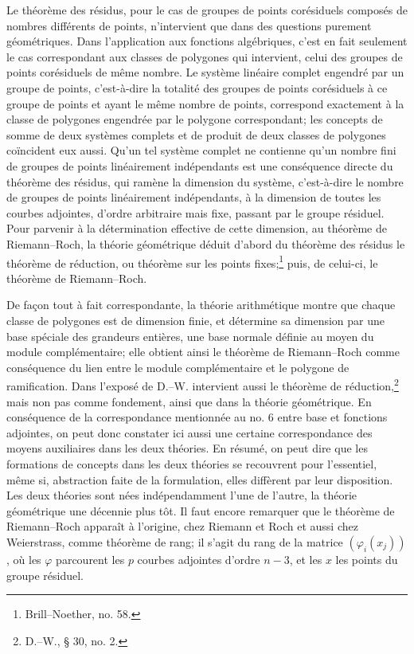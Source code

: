 Le théorème des résidus, pour le cas de groupes de points corésiduels composés de nombres différents de points, n'intervient que dans des questions purement géométriques. Dans l'application aux fonctions algébriques, c'est en fait seulement le cas correspondant aux classes de polygones qui intervient, celui des groupes de points corésiduels de même nombre. Le \og{}système linéaire complet\fg{} engendré par un groupe de points, c'est-à-dire la totalité des groupes de points corésiduels à ce groupe de points et ayant le même nombre de points, correspond exactement à la classe de polygones engendrée par le polygone correspondant; les concepts de \og{}somme de deux systèmes complets\fg{} et de \og{}produit de deux classes de polygones\fg{} coïncident eux aussi. Qu'un tel système complet ne contienne qu'un nombre fini de groupes de points linéairement indépendants est une conséquence directe du théorème des résidus, qui ramène la dimension du système, c'est-à-dire le nombre de groupes de points linéairement indépendants, à la dimension de toutes les courbes adjointes, d'ordre arbitraire mais fixe, passant par le groupe résiduel. Pour parvenir à la détermination effective de cette dimension, au théorème de Riemann--Roch, la théorie géométrique déduit d'abord du théorème des résidus le \og{}théorème de réduction\fg{}, ou théorème sur les points fixes;\footnote{Brill--Noether, no. 58.} puis, de celui-ci, le théorème de Riemann--Roch.

De façon tout à fait correspondante, la théorie arithmétique montre que chaque classe de polygones est de dimension finie, et détermine sa dimension par une base spéciale des grandeurs entières, une base normale définie au moyen du module complémentaire; elle obtient ainsi le théorème de Riemann--Roch comme conséquence du lien entre le module complémentaire et le polygone de ramification. Dans l'exposé de D.--W. intervient aussi le théorème de réduction,\footnote{D.--W., \S{} 30, no. 2.} mais non pas comme fondement, ainsi que dans la théorie géométrique. En conséquence de la correspondance mentionnée au no. 6 entre base et fonctions adjointes, on peut donc constater ici aussi une certaine correspondance des moyens auxiliaires dans les deux théories. En résumé, on peut dire que les formations de concepts dans les deux théories se recouvrent pour l'essentiel, même si, abstraction faite de la formulation, elles diffèrent par leur disposition. Les deux théories sont nées indépendamment l'une de l'autre, la théorie géométrique une décennie plus tôt. Il faut encore remarquer que le théorème de Riemann--Roch apparaît à l'origine, chez Riemann et Roch et aussi chez Weierstrass, comme théorème de rang; il s'agit du rang de la matrice \((\varphi_i(x_j))\), où les \(\varphi\) parcourent les \(p\) courbes adjointes d'ordre \(n-3\), et les \(x\) les points du groupe résiduel.

